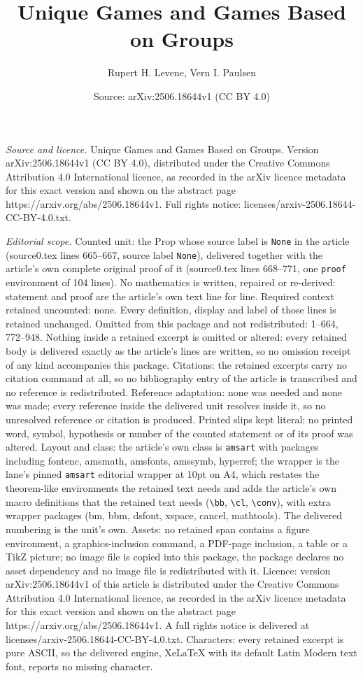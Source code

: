 \documentclass[10pt,a4paper]{amsart}
\title[Unique Games and Games Based on Groups]{Unique Games and Games Based on Groups}
\author{Rupert H. Levene, Vern I. Paulsen}
\date{Source: arXiv:2506.18644v1 (CC BY 4.0)}
\begin{document}
\maketitle

\noindent\emph{Source and licence.} Unique Games and Games Based on Groups. Version arXiv:2506.18644v1 (CC BY 4.0), distributed under the Creative Commons Attribution 4.0 International licence, as recorded in the arXiv licence metadata for this exact version and shown on the abstract page https://arxiv.org/abs/2506.18644v1. Full rights notice: licenses/arxiv-2506.18644-CC-BY-4.0.txt.\par\smallskip

\noindent\textit{Editorial scope.} Counted unit: the Prop whose source label is \texttt{None} in the article (source0.tex lines 665--667, source label \texttt{None}), delivered together with the article's own complete original proof of it (source0.tex lines 668--771, one \texttt{proof} environment of 104 lines). No mathematics is written, repaired or re-derived: statement and proof are the article's own text line for line. Required context retained uncounted: none. Every definition, display and label of those lines is retained unchanged. Omitted from this package and not redistributed: 1--664, 772--948. Nothing inside a retained excerpt is omitted or altered: every retained body is delivered exactly as the article's lines are written, so no omission receipt of any kind accompanies this package. Citations: the retained excerpts carry no citation command at all, so no bibliography entry of the article is transcribed and no reference is redistributed. Reference adaptation: none was needed and none was made; every reference inside the delivered unit resolves inside it, so no unresolved reference or citation is produced. Printed slips kept literal: no printed word, symbol, hypothesis or number of the counted statement or of its proof was altered. Layout and class: the article's own class is \texttt{amsart} with packages including fontenc, amsmath, amsfonts, amssymb, hyperref; the wrapper is the lane's pinned \texttt{amsart} editorial wrapper at 10pt on A4, which restates the theorem-like environments the retained text needs and adds the article's own macro definitions that the retained text needs (\texttt{\textbackslash bb}, \texttt{\textbackslash cl}, \texttt{\textbackslash conv}), with extra wrapper packages (bm, bbm, dsfont, xspace, cancel, mathtools). The delivered numbering is the unit's own. Assets: no retained span contains a figure environment, a graphics-inclusion command, a PDF-page inclusion, a table or a TikZ picture; no image file is copied into this package, the package declares no asset dependency and no image file is redistributed with it. Licence: version arXiv:2506.18644v1 of this article is distributed under the Creative Commons Attribution 4.0 International licence, as recorded in the arXiv licence metadata for this exact version and shown on the abstract page https://arxiv.org/abs/2506.18644v1. A full rights notice is delivered at licenses/arxiv-2506.18644-CC-BY-4.0.txt. Characters: every retained excerpt is pure ASCII, so the delivered engine, XeLaTeX with its default Latin Modern text font, reports no missing character.
\end{document}
